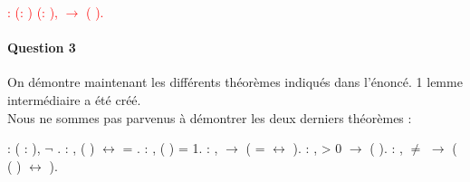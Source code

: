 \documentclass{report}
\begin{document}
\begin{coqdoccode}
\coqdocnoindent
\textcolor{red}{
 : \coqdockw{\ensuremath{\forall}} (: ) (: ),   \ensuremath{\rightarrow}  (  ).\coqdoceol
\coqdocemptyline
}
\end{coqdoccode}

\paragraph{Question 3}

On démontre maintenant les différents théorèmes indiqués dans l'énoncé. 1 lemme intermédiaire a été créé.\\
Nous ne sommes pas parvenus à démontrer les deux derniers théorèmes :

\noindent\begin{coqdoccode}
\coqdocemptyline
\coqdocnoindent
{}  : \coqdockw{\ensuremath{\forall}} ( : ), \ensuremath{\lnot}  .\coqdoceol
\coqdocemptyline
\coqdocnoindent
{}  : \coqdockw{\ensuremath{\forall}}   ,   ( ) \ensuremath{\leftrightarrow}  = .\coqdoceol
\coqdocemptyline
\coqdocnoindent
{}  :\coqdockw{\ensuremath{\forall}} ,   ( ) = 1.\coqdoceol
\coqdocemptyline
\coqdocnoindent
{}  : \coqdockw{\ensuremath{\forall}}  ,   \ensuremath{\rightarrow} (   =  \ensuremath{\leftrightarrow}   ).\coqdoceol
\coqdocemptyline
\coqdocnoindent
{}  : \coqdockw{\ensuremath{\forall}}   ,  > 0 \ensuremath{\rightarrow}   (   ).\coqdoceol
\coqdocemptyline
\coqdocnoindent
{}  : \coqdockw{\ensuremath{\forall}}    ,  \ensuremath{\not=}  \ensuremath{\rightarrow} (  (   ) \ensuremath{\leftrightarrow}   ).\coqdoceol
\coqdocemptyline
\end{coqdoccode}
\end{document}
